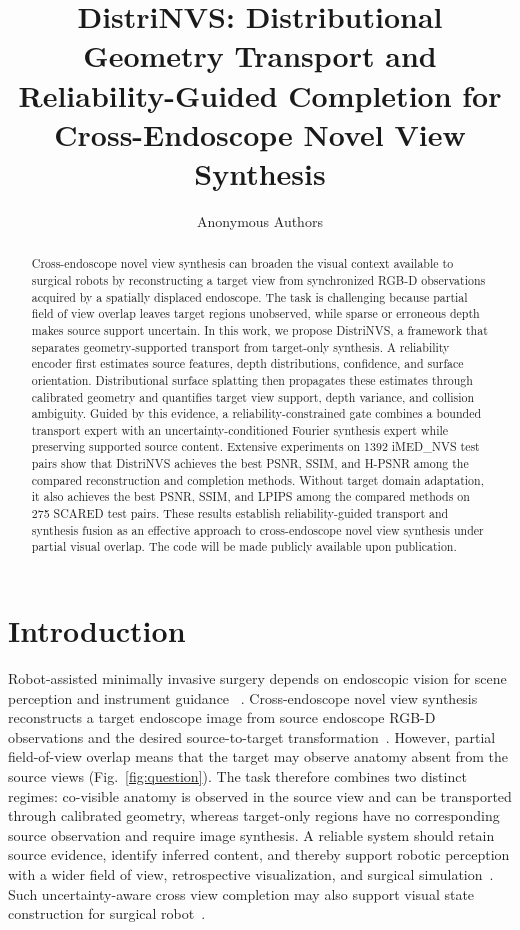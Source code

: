 \documentclass[letterpaper,10pt,conference]{ieeeconf}
\title{\LARGE \bf
DistriNVS: Distributional Geometry Transport and Reliability-Guided Completion for Cross-Endoscope Novel View Synthesis
}
\author{Anonymous Authors}
\begin{document}
\maketitle
\thispagestyle{empty}
\pagestyle{empty}

\begin{abstract}

Cross-endoscope novel view synthesis can broaden the visual context available
to surgical robots by reconstructing a target view from synchronized RGB-D
observations acquired by a spatially displaced endoscope. 
The task is challenging because partial field of view overlap leaves target regions unobserved, 
while sparse or erroneous depth makes source support uncertain.
In this work, we propose DistriNVS, a framework
that separates geometry-supported transport from target-only synthesis. A
reliability encoder first estimates source features, depth distributions,
confidence, and surface orientation. Distributional surface splatting then
propagates these estimates through calibrated geometry and quantifies
target view support, depth variance, and collision ambiguity. Guided by this
evidence, a reliability-constrained gate combines a bounded transport expert
with an uncertainty-conditioned Fourier synthesis expert while preserving
supported source content. Extensive experiments on 1392 iMED\_NVS
test pairs show that DistriNVS achieves the best PSNR, SSIM, and H-PSNR
among the compared reconstruction and completion methods. Without target domain
adaptation, it also achieves the best PSNR, SSIM, and LPIPS among the compared
methods on 275 SCARED test pairs. These results establish reliability-guided transport and synthesis fusion as an effective approach to cross-endoscope
novel view synthesis under partial visual overlap.
\textcolor{cosamLinkBlue}{The code will be made publicly available upon publication.}

\end{abstract}

\section{Introduction}
\label{sec:introduction}

Robot-assisted minimally invasive surgery depends on endoscopic vision for
scene perception and instrument guidance
~\cite{wei2026roboticperception}.
Cross-endoscope novel view synthesis reconstructs a target endoscope image from source endoscope RGB-D observations and the desired source-to-target transformation~\cite{wang2026endoe2egs}.
However, partial field-of-view overlap means that the target may observe anatomy absent from the source views (Fig.~\ref{fig:question}).
The task therefore combines two distinct regimes: co-visible anatomy is
observed in the source view and can be transported through calibrated geometry,
whereas target-only regions have no corresponding source observation and
require image synthesis.
A reliable system should
retain source evidence, identify inferred content, and thereby support
robotic perception with a wider field of view, retrospective visualization,
and surgical simulation~\cite{hsieh2026extrags}.
Such uncertainty-aware cross view completion may also support visual state
construction for surgical robot~\cite{he2025surgworld}.
\end{document}
